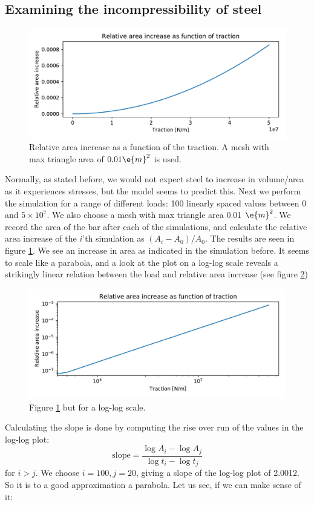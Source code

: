 \documentclass[sigconf]{acmart}
\begin{document}
\subsection{Examining the incompressibility of steel}
\begin{figure}
	\centering
	\includegraphics[width=\linewidth]{ex_loads.pdf}
	\caption{Relative area increase as a function of the traction. A mesh with max triangle area of $ 0.01 \e{m}^2 $ is used.}
	\label{fig:loads}
\end{figure}
Normally, as stated before, we would not expect steel to increase in volume/area as it experiences stresses, but the model seems to predict this. Next we perform the simulation for a range of different loads: 100 linearly spaced values between 0 and $ 5\times 10^7 $. We also choose a mesh with max triangle area 0.01 $ \e{m}^2 $. We record the area of the bar after each of the simulations, and calculate the relative area increase of the $ i $'th simulation as $ (A_i-A_0)/A_0 $. The results are seen in figure \ref{fig:loads}. We see an increase in area as indicated in the simulation before. It seems to scale like a parabola, and a look at the plot on a log-log scale reveals a strikingly linear relation between the load and relative area increase (see figure \ref{fig:logloads})
\begin{figure}
	\centering
	\includegraphics[width=\linewidth]{ex_logloads.pdf}
	\caption{Figure \ref{fig:loads} but for a log-log scale.}
	\label{fig:logloads}
\end{figure}
Calculating the slope is done by computing the rise over run of the values in the log-log plot:
\begin{equation}\label{eq:slope}
	\text{slope} = \frac{\log A_i - \log A_j}{\log t_i - \log t_j}
\end{equation}
for $ i > j $. We choose $ i=100, j=20 $, giving a slope of the log-log plot of 2.0012. So it is to a good approximation a parabola. Let us see, if we can make sense of it:
\end{document}
